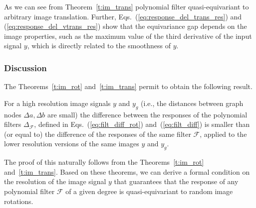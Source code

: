 \documentclass[10pt,journal,compsoc]{IEEEtran}
\begin{document}
	As we can see from Theorem~{\ref{t:im_trans}} polynomial filter quasi-equivariant to arbitrary image translation. Further, Eqs.~(\ref{eq:response_del_trans_res}) and (\ref{eq:response_del_vtrans_res}) show that the equivariance gap depends on the image properties, such as the maximum value of the third derivative of the input signal $y$, which is directly related to the smoothness of $y$. %

	\subsubsection{Discussion}
	\label{s:discussion}

		The Theorems~\ref{t:im_rot} and~\ref{t:im_trans} permit to obtain the following result.
	\begin{lemma}
		For a high resolution image signals $y$ and $y_g$ (i.e., the distances between graph nodes $\Delta a, \Delta b$ are small) the difference between the responses of the polynomial filters $\Delta_\mathcal{F}$, defined in Eqs.~(\ref{eq:filt_diff_rot}) and~(\ref{eq:filt_diff}) is smaller than (or equal to) the difference of the responses of the same filter $\mathcal{F}$, applied to the lower resolution versions of the same images $y$ and $y_g$. %
	\end{lemma}
	The proof of this naturally follows from the Theorems~\ref{t:im_rot} and~\ref{t:im_trans}. Based on these theorems, we can derive a formal condition on the resolution of the image signal $y$ that guarantees that the response of any polynomial filter $\mathcal{F}$ of a given degree is quasi-equivariant to random image rotations.
\end{document}
